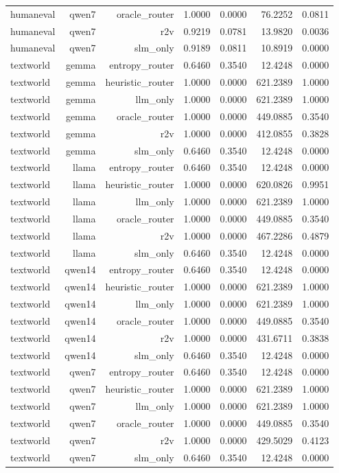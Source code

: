 \begin{table}[t]
\begin{tabular}{lrrrrrr}
humaneval & qwen7 & oracle_router & 1.0000 & 0.0000 & 76.2252 & 0.0811 \\
humaneval & qwen7 & r2v & 0.9219 & 0.0781 & 13.9820 & 0.0036 \\
humaneval & qwen7 & slm_only & 0.9189 & 0.0811 & 10.8919 & 0.0000 \\
textworld & gemma & entropy_router & 0.6460 & 0.3540 & 12.4248 & 0.0000 \\
textworld & gemma & heuristic_router & 1.0000 & 0.0000 & 621.2389 & 1.0000 \\
textworld & gemma & llm_only & 1.0000 & 0.0000 & 621.2389 & 1.0000 \\
textworld & gemma & oracle_router & 1.0000 & 0.0000 & 449.0885 & 0.3540 \\
textworld & gemma & r2v & 1.0000 & 0.0000 & 412.0855 & 0.3828 \\
textworld & gemma & slm_only & 0.6460 & 0.3540 & 12.4248 & 0.0000 \\
textworld & llama & entropy_router & 0.6460 & 0.3540 & 12.4248 & 0.0000 \\
textworld & llama & heuristic_router & 1.0000 & 0.0000 & 620.0826 & 0.9951 \\
textworld & llama & llm_only & 1.0000 & 0.0000 & 621.2389 & 1.0000 \\
textworld & llama & oracle_router & 1.0000 & 0.0000 & 449.0885 & 0.3540 \\
textworld & llama & r2v & 1.0000 & 0.0000 & 467.2286 & 0.4879 \\
textworld & llama & slm_only & 0.6460 & 0.3540 & 12.4248 & 0.0000 \\
textworld & qwen14 & entropy_router & 0.6460 & 0.3540 & 12.4248 & 0.0000 \\
textworld & qwen14 & heuristic_router & 1.0000 & 0.0000 & 621.2389 & 1.0000 \\
textworld & qwen14 & llm_only & 1.0000 & 0.0000 & 621.2389 & 1.0000 \\
textworld & qwen14 & oracle_router & 1.0000 & 0.0000 & 449.0885 & 0.3540 \\
textworld & qwen14 & r2v & 1.0000 & 0.0000 & 431.6711 & 0.3838 \\
textworld & qwen14 & slm_only & 0.6460 & 0.3540 & 12.4248 & 0.0000 \\
textworld & qwen7 & entropy_router & 0.6460 & 0.3540 & 12.4248 & 0.0000 \\
textworld & qwen7 & heuristic_router & 1.0000 & 0.0000 & 621.2389 & 1.0000 \\
textworld & qwen7 & llm_only & 1.0000 & 0.0000 & 621.2389 & 1.0000 \\
textworld & qwen7 & oracle_router & 1.0000 & 0.0000 & 449.0885 & 0.3540 \\
textworld & qwen7 & r2v & 1.0000 & 0.0000 & 429.5029 & 0.4123 \\
textworld & qwen7 & slm_only & 0.6460 & 0.3540 & 12.4248 & 0.0000 \\
\hline
\end{tabular}
\end{table}
